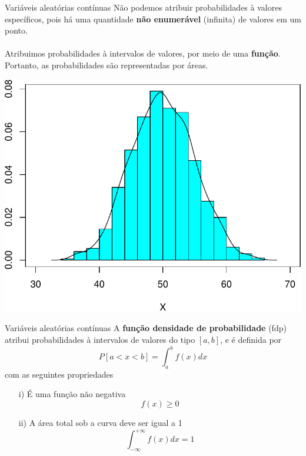 \documentclass[10pt]{beamer}\usepackage[]{graphicx}\usepackage[]{color}
\newenvironment{knitrout}{}{} %
\theoremstyle{definition}
\begin{document}
\begin{frame}[fragile]{Variáveis aleatórias contínuas}
  Não podemos atribuir probabilidades à valores específicos, pois há uma
  quantidade \textbf{não enumerável} (infinita) de valores em um
  ponto. \\~\\
  Atribuimos probabilidades à intervalos de valores,
  por meio de uma \textbf{função}. Portanto, as probabilidades são
  representadas por áreas.
\begin{knitrout}\footnotesize
{}\color{fgcolor}

{\centering \includegraphics[width=.7\textwidth]{figure/unnamed-chunk-4-1} 

}



\end{knitrout}
\end{frame}

\begin{frame}[fragile]{Variáveis aleatórias contínuas}
  A \textbf{função densidade de probabilidade} (fdp) atribui
  probabilidades à intervalos de valores do tipo $[a,b]$, e é definida
  por
  \begin{equation*}
    P[a < x < b] = \int_{a}^{b} f(x) dx
  \end{equation*}
  com as seguintes propriedades
  \begin{itemize}
  \item[i)] É uma função não negativa
    \begin{equation*}
      f(x) \geq 0
    \end{equation*}
  \item[ii)] A área total sob a curva deve ser igual a 1
    \begin{equation*}
      \int_{-\infty}^{+\infty} f(x) dx = 1
    \end{equation*}
  \end{itemize}
\end{frame}
\end{document}
